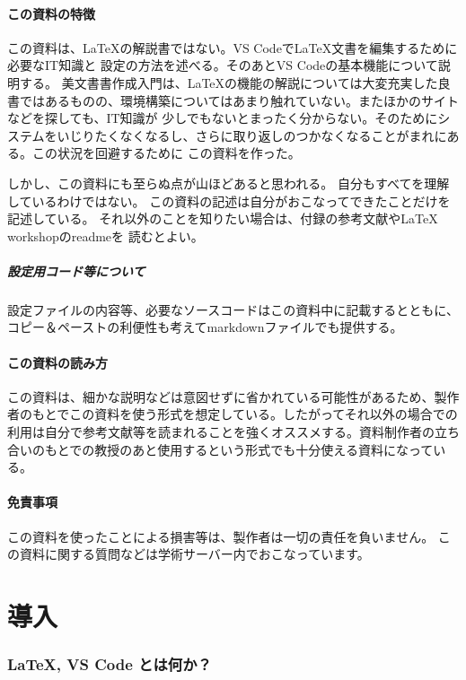 \documentclass[titlepage]{ltjsarticle}
\begin{document}
\subsection{この資料の特徴}
この資料は、\LaTeX の解説書ではない。VS Codeで\LaTeX 文書を編集するために必要なIT知識と
設定の方法を述べる。そのあとVS Codeの基本機能について説明する。
美文書書作成入門\cite{美文書本}は、\LaTeX の機能の解説については大変充実した良書ではあるものの、環境構築についてはあまり触れていない。またほかのサイトなどを探しても、IT知識が
少しでもないとまったく分からない。そのためにシステムをいじりたくなくなるし、さらに取り返しのつかなくなることがまれにある。この状況を回避するために
この資料を作った。

しかし、この資料にも至らぬ点が山ほどあると思われる。
自分もすべてを理解しているわけではない。
この資料の記述は自分がおこなってできたことだけを記述している。
それ以外のことを知りたい場合は、付録の参考文献やLaTeX workshopのreadmeを
読むとよい。

\subsubsection{設定用コード等について}
設定ファイルの内容等、必要なソースコードはこの資料中に記載するとともに、コピー＆ペーストの利便性も考えてmarkdownファイルでも提供する。


\subsection{この資料の読み方}
この資料は、細かな説明などは意図せずに省かれている可能性があるため、製作者のもとでこの資料を使う形式を想定している。したがってそれ以外の場合での利用は自分で参考文献等を読まれることを強くオススメする。資料制作者の立ち合いのもとでの教授のあと使用するという形式でも十分使える資料になっている。

\subsection{免責事項}
この資料を使ったことによる損害等は、製作者は一切の責任を負いません。
この資料に関する質問などは学術サーバー内でおこなっています。

\tableofcontents
\clearpage

\part{導入}
\section{\LaTeX , VS Code とは何か？}
\end{document}
